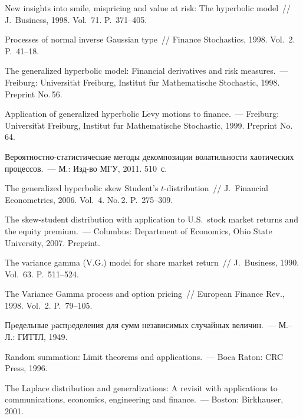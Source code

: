 \begin{multicols}{2}
{{\begin{thebibliography}{99}
New insights into smile, mispricing and value at risk: The
hyperbolic model~// J.~Business, 1998. Vol.~71. P.~371--405.

 Processes of normal inverse Gaussian type~//
Finance Stochastics, 1998. Vol.~2. P.~41--18.

The generalized hyperbolic model: Financial derivatives and risk
measures.~--- Freiburg: Universit$\ddot{\mbox{a}}$t Freiburg, Institut f$\ddot{\mbox{u}}$r
Mathematische Stochastic, 1998. Preprint No.\,56.

Application of generalized hyperbolic L$\grave{\mbox{e}}$vy
motions to finance.~--- Freiburg: Universit$\ddot{\mbox{a}}$t Freiburg, Institut
f$\ddot{\mbox{u}}$r Mathematische Stochastic, 1999. Preprint No.\,64.

 Ве\-ро\-ят\-но\-ст\-но-ста\-ти\-сти\-че\-ские методы
декомпозиции волатильности хаотических процессов.~--- М.: Изд-во
МГУ, 2011. 510~с.

The generalized
hyperbolic skew Student's $t$-distribution~// J.~Financial
Econometrics, 2006. Vol.~4. No.\,2. P.~275--309.

 The skew-student distribution with application to U.S.\ stock
market returns and the equity premium.~--- Columbus: Department of
Economics, Ohio State University, 2007. Preprint.

 The variance gamma (V.G.) model for
share market return~// J.~Business, 1990. Vol.~63.
P.~511--524.

The Variance Gamma process and option pricing~//
European Finance Rev., 1998. Vol.~2. P.~79--105.

 Пpедельные
pаспpеделения для сумм независимых случайных величин.~--- М.--Л.:
ГИТТЛ, 1949.

 Random summation:
Limit theorems and applications.~--- Boca Raton: CRC Press, 1996.

 The Laplace distribution and generalizations: A
revisit with applications to communications, economics,
engineering and finance.~--- Boston: Birkhauser, 2001.


\end{thebibliography}}}
\end{multicols}
